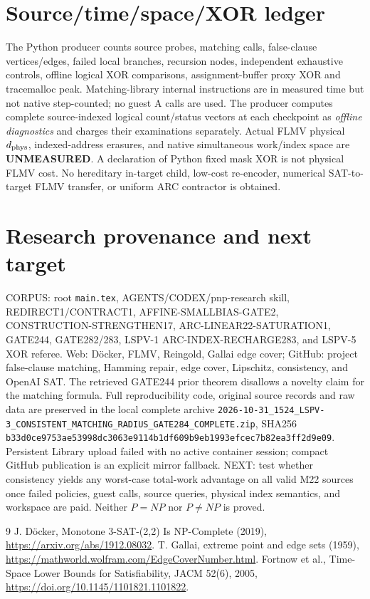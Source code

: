 \documentclass[11pt]{article}
\begin{document}
\section{Source/time/space/XOR ledger}
The Python producer counts source probes, matching calls, false-clause vertices/edges, failed local branches, recursion nodes, independent exhaustive controls, offline logical XOR comparisons, assignment-buffer proxy XOR and tracemalloc peak. Matching-library internal instructions are in measured time but not native step-counted; no guest A calls are used. The producer computes complete source-indexed logical count/status vectors at each checkpoint as \emph{offline diagnostics} and charges their examinations separately. Actual FLMV physical $d_{\rm phys}$, indexed-address erasures, and native simultaneous work/index space are \textbf{UNMEASURED}. A declaration of Python fixed mask XOR is not physical FLMV cost. No hereditary in-target child, low-cost re-encoder, numerical SAT-to-target FLMV transfer, or uniform ARC contractor is obtained.
\section{Research provenance and next target}
CORPUS: root \texttt{main.tex}, AGENTS/CODEX/pnp-research skill, REDIRECT1/CONTRACT1, AFFINE-SMALLBIAS-GATE2, CONSTRUCTION-STRENGTHEN17, ARC-LINEAR22-SATURATION1, GATE244, GATE282/283, LSPV-1 ARC-INDEX-RECHARGE283, and LSPV-5 XOR referee. Web: D\"ocker, FLMV, Reingold, Gallai edge cover; GitHub: project false-clause matching, Hamming repair, edge cover, Lipschitz, consistency, and OpenAI SAT. The retrieved GATE244 prior theorem disallows a novelty claim for the matching formula. Full reproducibility code, original source records and raw data are preserved in the local complete archive \texttt{2026-10-31\_1524\_LSPV-3\_CONSISTENT\_MATCHING\_RADIUS\_GATE284\_COMPLETE.zip}, SHA256 \texttt{b33d0ce9753ae53998dc3063e9114b1df609b9eb1993efcec7b82ea3ff2d9e09}. Persistent Library upload failed with no active container session; compact GitHub publication is an explicit mirror fallback.
NEXT: test whether consistency yields any worst-case total-work advantage on all valid M22 sources once failed policies, guest calls, source queries, physical index semantics, and workspace are paid. Neither $P=NP$ nor $P\ne NP$ is proved.
\begin{thebibliography}{9}
 J. D\"ocker, Monotone 3-SAT-(2,2) Is NP-Complete (2019), \url{https://arxiv.org/abs/1912.08032}.
 T. Gallai, extreme point and edge sets (1959), \url{https://mathworld.wolfram.com/EdgeCoverNumber.html}.
 Fortnow et al., Time-Space Lower Bounds for Satisfiability, JACM 52(6), 2005, \url{https://doi.org/10.1145/1101821.1101822}.
\end{thebibliography}
\end{document}
